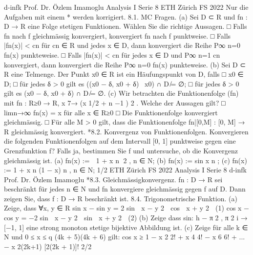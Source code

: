 d-infk
Prof. Dr. Özlem Imamoglu
Analysis I
Serie 8
ETH Zürich
FS 2022
Nur die Aufgaben mit einem * werden korrigiert.
8.1. MC Fragen.
(a) Sei D ⊂ R und fn : D → R eine Folge stetigen Funktionen. Wählen Sie die
richtige Aussagen.
□ Falls fn nach f gleichmässig konvergiert, konvergiert fn nach f punktweise.
□ Falls |fn(x)| < cn für cn ∈ R und jedes x ∈ D, dann konvergiert die Reihe
P∞
n=0 fn(x) punkteweise.
□ Falls |fn(x)| < cn für jedes x ∈ D und P∞
n=1 cn konvergiert, dann konvergiert die Reihe P∞
n=0 fn(x) punkteweise.
(b) Sei D ⊂ R eine Telmenge. Der Punkt x0 ∈ R ist ein Häufungspunkt von D, falls
□ x0 ∈ D;
□ für jedes δ > 0 gilt es ((x0 − δ, x0 + δ) \ {x0}) ∩ D ̸= ∅;
□ für jedes δ > 0 gilt es (x0 − δ, x0 + δ) ∩ D ̸= ∅.
(c) Wir betrachten die Funktionenfolge (fn) mit
fn : R≥0 → R, x 7→ (x
1/2 + n
−1
)
2
.
Welche der Aussagen gilt?
□ limn→∞ fn(x) = x für alle x ∈ R≥0
□ Die Funktionenfolge konvergiert gleichmässig.
□ Für alle M > 0 gilt, dass die Funktionenfolge fn|[0,M]
: [0, M] → R
gleichmässig konvergiert.
*8.2. Konvergenz von Funktionenfolgen. Konvergieren die folgenden Funktionenfolgen auf dem Intervall [0, 1] punktweise gegen eine Grenzfunktion f? Falls ja,
bestimmen Sie f und untersuche, ob die Konvergenz gleichmässig ist.
(a) fn(x) :=

1 +
x
n
2
, n ∈ N;
(b) fn(x) :=
sin x
n
;
(c) fn(x) := 1 + x
n
(1 − x)
n
, n ∈ N;
1/2
ETH Zürich
FS 2022
Analysis I
Serie 8
d-infk
Prof. Dr. Özlem Imamoglu
*8.3. Gleichmässigkonvergenz. fn : D → R sei beschränkt für jedes n ∈ N und fn
konvergiere gleichmässig gegen f auf D. Dann zeigen Sie, dass f : D → R beschränkt
ist.
8.4. Trigonometrische Funktion.
(a) Zeige, dass ∀x, y ∈ R
sin x − sin y = 2 sin 
x − y
2

cos 
x + y
2

(1)
cos x − cos y = −2 sin 
x − y
2

sin 
x + y
2

(2)
(b) Zeige dass sin: h
−
π
2
,
π
2
i
→ [−1, 1] eine strong monoton stetige bijektive Abbildung ist.
(c) Zeige für alle k ∈ N und 0 ≤ x ≤
q
(4k + 5)(4k + 6) gilt:
cos x ≥ 1 −
x
2
2! +
x
4
4! −
x
6
6! + ... −
x
2(2k+1)
[2(2k + 1)]!
2/2
